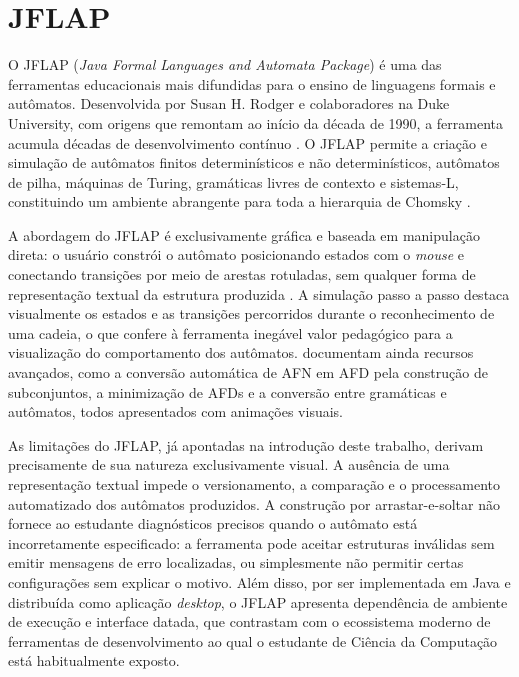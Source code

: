 \documentclass[
    12pt
    ,oneside
    ,a4paper
    ,chapter=TITLE
    ,section=TITLE
    ,sumario=abnt-6027-2012]{abntex2}
\begin{document}
\section{JFLAP}
\label{sec:rel-jflap}

O JFLAP (\textit{Java Formal Languages and Automata Package}) é uma das ferramentas
educacionais mais difundidas para o ensino de linguagens formais e autômatos.
Desenvolvida por Susan H. Rodger e colaboradores na Duke University, com origens que remontam
ao início da década de 1990, a ferramenta acumula décadas de desenvolvimento contínuo
\cite{rodger2006jflap}. O JFLAP permite a criação e simulação de autômatos finitos
determinísticos e não determinísticos, autômatos de pilha, máquinas de Turing, gramáticas livres
de contexto e sistemas-L, constituindo um ambiente abrangente para toda a hierarquia de Chomsky
\cite{rodger2006jflap}.

A abordagem do JFLAP é exclusivamente gráfica e baseada em manipulação direta: o usuário
constrói o autômato posicionando estados com o \textit{mouse} e conectando transições por meio
de arestas rotuladas, sem qualquer forma de representação textual da estrutura produzida
\cite{rodger2006jflap}. A simulação passo a passo destaca visualmente os estados e as
transições percorridos durante o reconhecimento de uma cadeia, o que confere à ferramenta
inegável valor pedagógico para a visualização do comportamento dos autômatos.
 documentam ainda recursos avançados, como a conversão automática de AFN
em AFD pela construção de subconjuntos, a minimização de AFDs e a conversão entre gramáticas e
autômatos, todos apresentados com animações visuais.

As limitações do JFLAP, já apontadas na introdução deste trabalho, derivam precisamente de sua
natureza exclusivamente visual. A ausência de uma representação textual impede o versionamento,
a comparação e o processamento automatizado dos autômatos produzidos. A construção por
arrastar-e-soltar não fornece ao estudante diagnósticos precisos quando o autômato está
incorretamente especificado: a ferramenta pode aceitar estruturas inválidas sem emitir mensagens
de erro localizadas, ou simplesmente não permitir certas configurações sem explicar o motivo.
Além disso, por ser implementada em Java e distribuída como aplicação \textit{desktop}, o JFLAP
apresenta dependência de ambiente de execução e interface datada, que contrastam com o
ecossistema moderno de ferramentas de desenvolvimento ao qual o estudante de Ciência da
Computação está habitualmente exposto.
\end{document}
